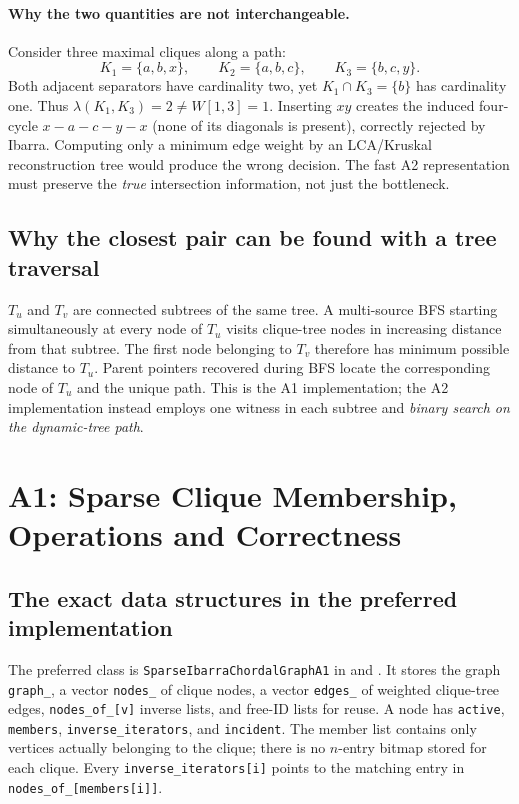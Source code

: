 \paragraph{Why the two quantities are not interchangeable.} Consider three maximal cliques along a path:
\[
K_1=\{a,b,x\},\qquad K_2=\{a,b,c\},\qquad K_3=\{b,c,y\}.
\]
Both adjacent separators have cardinality two, yet \(K_1\cap K_3=\{b\}\) has cardinality one.  Thus \(\lambda(K_1,K_3)=2\ne W[1,3]=1\).  Inserting \(xy\) creates the induced four-cycle \(x-a-c-y-x\) (none of its diagonals is present), correctly rejected by Ibarra.  Computing only a minimum edge weight by an LCA/Kruskal reconstruction tree would produce the wrong decision.  The fast A2 representation must preserve the \emph{true} intersection information, not just the bottleneck.

\subsection{Why the closest pair can be found with a tree traversal}
\(T_u\) and \(T_v\) are connected subtrees of the same tree.  A multi-source BFS starting simultaneously at every node of \(T_u\) visits clique-tree nodes in increasing distance from that subtree.  The first node belonging to \(T_v\) therefore has minimum possible distance to \(T_u\).  Parent pointers recovered during BFS locate the corresponding node of \(T_u\) and the unique path.  This is the A1 implementation; the A2 implementation instead employs one witness in each subtree and \emph{binary search on the dynamic-tree path}.

\section{A1: Sparse Clique Membership, Operations and Correctness}
\label{sec:a1-full}
\subsection{The exact data structures in the preferred implementation}
The preferred class is \texttt{SparseIbarraChordalGraphA1} in  and .  It stores the graph \texttt{graph\_}, a vector \texttt{nodes\_} of clique nodes, a vector \texttt{edges\_} of weighted clique-tree edges, \texttt{nodes\_of\_[v]} inverse lists, and free-ID lists for reuse.  A node has \texttt{active}, \texttt{members}, \texttt{inverse\_iterators}, and \texttt{incident}.  The member list contains only vertices actually belonging to the clique; there is no \(n\)-entry bitmap stored for each clique.  Every \texttt{inverse\_iterators[i]} points to the matching entry in \texttt{nodes\_of\_[members[i]]}.

